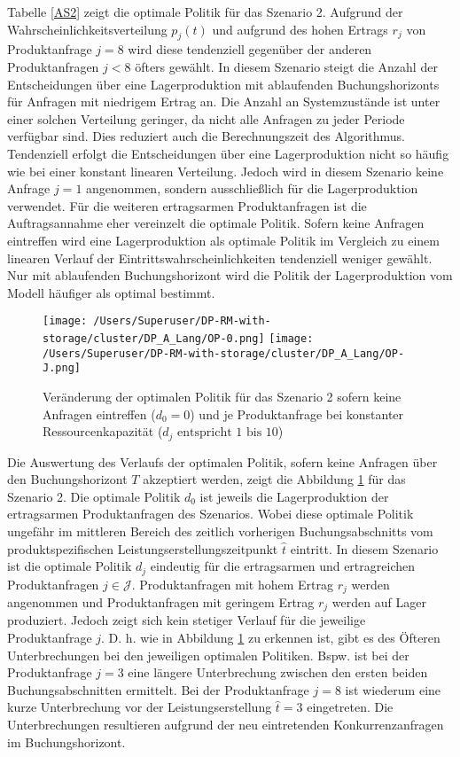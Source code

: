 Tabelle \ref{AS2} zeigt die optimale Politik für das Szenario 2. Aufgrund der Wahrscheinlichkeitsverteilung $p_j(t)$ und aufgrund des hohen Ertrags $r_j$ von Produktanfrage $j=8$ wird diese tendenziell gegenüber der anderen Produktanfragen $j<8$ öfters gewählt. In diesem Szenario steigt die Anzahl der Entscheidungen über eine Lagerproduktion mit ablaufenden Buchungshorizonts für Anfragen mit niedrigem Ertrag an. Die Anzahl an Systemzustände ist unter einer solchen Verteilung geringer, da nicht alle Anfragen zu jeder Periode verfügbar sind. Dies reduziert auch die Berechnungszeit des Algorithmus. Tendenziell erfolgt die Entscheidungen über eine Lagerproduktion nicht so häufig wie bei einer konstant linearen Verteilung. Jedoch wird in diesem Szenario keine Anfrage $j=1$ angenommen, sondern ausschließlich für die Lagerproduktion verwendet. Für die weiteren ertragsarmen Produktanfragen ist die Auftragsannahme eher vereinzelt die optimale Politik. Sofern keine Anfragen eintreffen wird eine Lagerproduktion als optimale Politik im Vergleich zu einem linearen Verlauf der Eintrittswahrscheinlichkeiten tendenziell weniger gewählt. Nur mit ablaufenden Buchungshorizont wird die Politik der Lagerproduktion vom Modell häufiger als optimal bestimmt.

\begin{figure}[h!]     
\begin{center}
\texttt{[image: /Users/Superuser/DP-RM-with-storage/cluster/DP\_A\_Lang/OP-0.png]}
\texttt{[image: /Users/Superuser/DP-RM-with-storage/cluster/DP\_A\_Lang/OP-J.png]}
    \caption{Veränderung der optimalen Politik für das Szenario 2 sofern keine Anfragen eintreffen ($d_0=0$) und je Produktanfrage bei konstanter Ressourcenkapazität ($d_j\text{ entspricht }1\text{ bis }10$)}  \label{SV2}
  \end{center}
\end{figure}

Die Auswertung des Verlaufs der optimalen Politik, sofern keine Anfragen über den Buchungshorizont $T$ akzeptiert werden, zeigt die Abbildung \ref{SV2} für das Szenario 2. Die optimale Politik $d_0$ ist jeweils die Lagerproduktion der ertragsarmen Produktanfragen des Szenarios. Wobei diese optimale Politik ungefähr im mittleren Bereich des zeitlich vorherigen Buchungsabschnitts vom produktspezifischen Leistungserstellungszeitpunkt $\hat t$ eintritt. In diesem Szenario ist die optimale Politik $d_j$ eindeutig für die ertragsarmen und ertragreichen Produktanfragen $j\in\mathcal{J}$. Produktanfragen mit hohem Ertrag $r_j$ werden angenommen und Produktanfragen mit geringem Ertrag $r_j$ werden auf Lager produziert. Jedoch zeigt sich kein stetiger Verlauf für die jeweilige Produktanfrage $j$. D. h. wie in Abbildung \ref{SV2} zu erkennen ist, gibt es des Öfteren Unterbrechungen bei den jeweiligen optimalen Politiken. Bspw. ist bei der Produktanfrage $j=3$ eine längere Unterbrechung zwischen den ersten beiden Buchungsabschnitten ermittelt. Bei der Produktanfrage $j=8$ ist wiederum eine kurze Unterbrechung vor der Leistungserstellung $\hat t = 3$ eingetreten. Die Unterbrechungen resultieren aufgrund der neu eintretenden Konkurrenzanfragen im Buchungshorizont.\\[.5cm]

